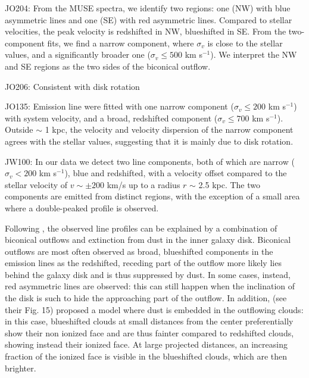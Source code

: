\documentclass[fleqn,usenatbib]{mnras}
\begin{document}
JO204: From the MUSE spectra, we identify two regions: one (NW) with blue asymmetric lines and one (SE) with red asymmetric lines. Compared to stellar velocities, the peak velocity is redshifted in NW, blueshifted in SE. From the two-component fits, we find a narrow component, where $\sigma_v$ is close to the stellar values, and a significantly broader one ($\sigma_v \le 500$ km s$^{-1}$). We interpret the NW and SE regions as the two sides of the biconical  outflow.


JO206: Consistent with disk rotation

JO135:  Emission line were fitted with one narrow component ($\sigma_v \le 200$ km s$^{-1}$) with system velocity, and a broad, redshifted component ($\sigma_v \le 700$ km s$^{-1}$). Outside $\sim$ 1 kpc, the velocity and velocity dispersion of the narrow component agrees with the stellar values, suggesting that it is mainly due to disk rotation.

JW100: In our data we detect two line components,  both of which are  narrow ($\sigma_v < 200$ km s$^{-1}$), blue and redshifted, with a velocity offset compared to the stellar velocity of $v \sim \pm 200$ km/s up to a radius $r$ $\sim$ 2.5 kpc. 
The two components are emitted from  distinct regions, with the exception of a small area where a double-peaked profile is observed. 

Following \citet{2010ApJ...708..419C}, the observed line profiles can be explained by a combination of biconical outflows and extinction from dust in the inner galaxy disk.  Biconical outflows are most often observed as broad, blueshifted components in the emission lines as the redshifted, receding part of the outflow more likely lies behind the galaxy disk and is thus suppressed by dust. 
In some cases, instead, red asymmetric lines are observed: this can still happen when the inclination of the disk is such to hide the approaching part of the outflow. 
In addition, \citet{2015ApJ...806...84L} (see their Fig. 15) proposed a model where dust is embedded in the outflowing clouds: in this case,
blueshifted clouds at small distances from the center preferentially show their non ionized face and are thus fainter compared to redshifted clouds, showing instead their ionized face.
At large projected distances, an increasing fraction of the ionized face is visible in the blueshifted clouds, which are then brighter.


\end{document}
